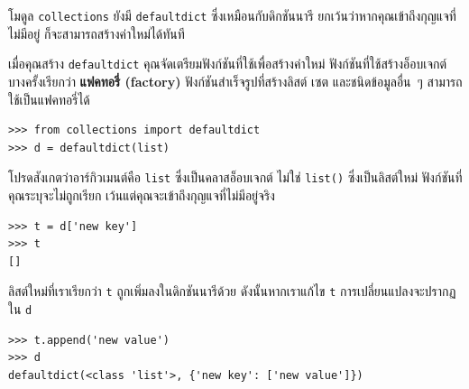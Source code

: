 โมดูล {\tt collections} ยังมี {\tt defaultdict} ซึ่งเหมือนกับดิกชันนารี ยกเว้นว่าหากคุณเข้าถึงกุญแจที่ไม่มีอยู่ ก็จะสามารถสร้างค่าใหม่ได้ทันที



เมื่อคุณสร้าง \texttt{defaultdict} คุณจัดเตรียมฟังก์ชันที่ใช้เพื่อสร้างค่าใหม่ ฟังก์ชันที่ใช้สร้างอ็อบเจกต์บางครั้งเรียกว่า {\bf แฟคทอรี่ (factory)} 
ฟังก์ชันสำเร็จรูปที่สร้างลิสต์ เซต และชนิดข้อมูลอื่น~ๆ สามารถใช้เป็นแฟคทอรี่ได้

\begin{verbatim}
>>> from collections import defaultdict
>>> d = defaultdict(list)
\end{verbatim}

โปรดสังเกตว่าอาร์กิวเมนต์คือ {\tt list} ซึ่งเป็นคลาสอ็อบเจกต์ ไม่ใช่ {\tt list()} ซึ่งเป็นลิสต์ใหม่ 
ฟังก์ชันที่คุณระบุจะไม่ถูกเรียก เว้นแต่คุณจะเข้าถึงกุญแจที่ไม่มีอยู่จริง


\begin{verbatim}
>>> t = d['new key']
>>> t
[]
\end{verbatim}

ลิสต์ใหม่ที่เราเรียกว่า {\tt t} ถูกเพิ่มลงในดิกชันนารีด้วย ดังนั้นหากเราแก้ไข {\tt t} การเปลี่ยนแปลงจะปรากฏใน {\tt d}

\begin{verbatim}
>>> t.append('new value')
>>> d
defaultdict(<class 'list'>, {'new key': ['new value']})
\end{verbatim}

	
